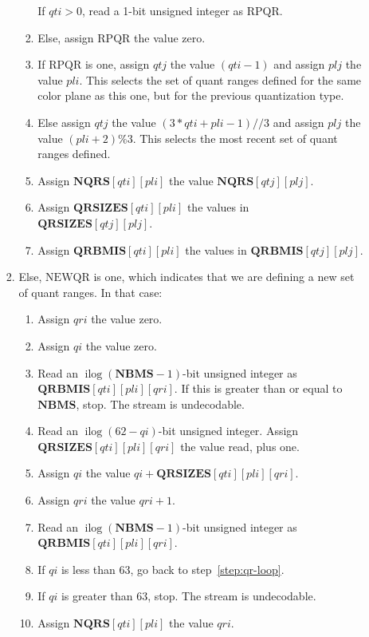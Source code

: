 \documentclass[9pt,letterpaper]{book}
\newcommand{\idx}[1]{{\ensuremath{\mathit{#1}}}}
\newcommand{\qti}{\idx{qti}}
\newcommand{\qtj}{\idx{qtj}}
\newcommand{\pli}{\idx{pli}}
\newcommand{\plj}{\idx{plj}}
\newcommand{\qi}{\idx{qi}}
\newcommand{\qri}{\idx{qri}}
\newcommand{\bitvar}[1]{\ensuremath{\mathbf{\bm{#1}}}}
\newcommand{\locvar}[1]{\ensuremath{\mathrm{#1}}}
\newcommand{\ilog}{\ensuremath{\mathop{\mathrm{ilog}}\nolimits}}
\numberwithin{equation}{chapter}
\numberwithin{figure}{chapter}
\numberwithin{table}{chapter}
\begin{document}
\begin{enumerate}
\begin{enumerate}
\begin{enumerate}
\begin{enumerate}
If $\locvar{\qti}>0$, read a 1-bit unsigned integer as \locvar{RPQR}.
\item
Else, assign \locvar{RPQR} the value zero.
\item
If \locvar{RPQR} is one, assign \locvar{\qtj} the value $(\locvar{\qti}-1)$
 and assign \locvar{\plj} the value \locvar{\pli}.
This selects the set of quant ranges defined for the same color plane as this
 one, but for the previous quantization type.
\item
Else assign \locvar{\qtj} the value $(3*\locvar{\qti}+\locvar{\pli}-1)//3$ and
 assign \locvar{\plj} the value $(\locvar{\pli}+2)\%3$.
This selects the most recent set of quant ranges defined.
\item
Assign $\bitvar{NQRS}[\locvar{\qti}][\locvar{\pli}]$ the value
 $\bitvar{NQRS}[\locvar{\qtj}][\locvar{\plj}]$.
\item
Assign $\bitvar{QRSIZES}[\locvar{\qti}][\locvar{\pli}]$ the values in 
 $\bitvar{QRSIZES}[\locvar{\qtj}][\locvar{\plj}]$.
\item
Assign $\bitvar{QRBMIS}[\locvar{\qti}][\locvar{\pli}]$ the values in
 $\bitvar{QRBMIS}[\locvar{\qtj}][\locvar{\plj}]$.
\end{enumerate}
\item
Else, \locvar{NEWQR} is one, which indicates that we are defining a new set of
 quant ranges.
In that case:
\begin{enumerate}
\item
Assign $\locvar{\qri}$ the value zero.
\item
Assign $\locvar{\qi}$ the value zero.
\item
Read an $\ilog(\bitvar{NBMS}-1)$-bit unsigned integer as\\
 $\bitvar{QRBMIS}[\locvar{\qti}][\locvar{\pli}][\locvar{\qri}]$.
If this is greater than or equal to \bitvar{NBMS}, stop.
The stream is undecodable.
\item
\label{step:qr-loop}
Read an $\ilog(62-\locvar{\qi})$-bit unsigned integer.
Assign\\ $\bitvar{QRSIZES}[\locvar{\qti}][\locvar{\pli}][\locvar{\qri}]$ the value
 read, plus one.
\item
Assign \locvar{\qi} the value $\locvar{\qi}+
 \bitvar{QRSIZES}[\locvar{\qti}][\locvar{\pli}][\locvar{\qri}]$.
\item
Assign \locvar{\qri} the value $\locvar{\qri}+1$.
\item
Read an $\ilog(\bitvar{NBMS}-1)$-bit unsigned integer as\\
 $\bitvar{QRBMIS}[\locvar{\qti}][\locvar{\pli}][\locvar{\qri}]$.
\item
If \locvar{\qi} is less than 63, go back to step~\ref{step:qr-loop}.
\item
If \locvar{\qi} is greater than 63, stop.
The stream is undecodable.
\item
Assign $\bitvar{NQRS}[\locvar{\qti}][\locvar{\pli}]$ the value \locvar{\qri}.
\end{enumerate}
\end{enumerate}
\end{enumerate}
\end{enumerate}
\end{document}
